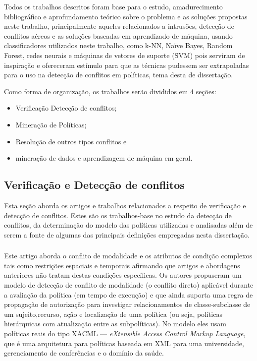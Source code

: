 Todos os trabalhos descritos foram base para o estudo, amadurecimento bibliográfico e aprofundamento teórico sobre o problema e as soluções propostas neste trabalho, principalmente aqueles relacionados a intrusões, detecção de conflitos aéreos e as soluções baseadas em aprendizado de máquina, usando classificadores utilizados neste trabalho, como k-NN, Naïve Bayes, Random Forest, redes neurais e máquinas de vetores de suporte (SVM) pois serviram de inspiração e ofereceram estímulo para que as técnicas pudessem ser extrapoladas para o uso na detecção de conflitos em políticas, tema desta de dissertação. 

Como forma de organização, os trabalhos serão divididos em 4 seções:\begin{itemize}
	\item Verificação Detecção de conflitos;
	\item Mineração de Políticas;
	\item Resolução de outros tipos conflitos e 
	\item mineração de dados e aprendizagem de máquina em geral.
\end{itemize}

\subsection{Verificação e Detecção de conflitos}\label{sec:deteccao-conflitos}
Esta seção aborda os artigos e trabalhos relacionados a respeito de verificação e detecção de conflitos. Estes são os trabalhos-base no estudo da detecção de conflitos, da determinação do modelo das políticas utilizadas e analisadas além de serem a fonte de algumas das principais definições empregadas nesta dissertação.
\subsubsection{\cite{kuang_modality_2020} }
Este artigo aborda o conflito de modalidade e os atributos de condição complexos tais como restrições espaciais e temporais afirmando que artigos e abordagens anteriores não tratam destas condições específicas. Os autores propuseram um modelo de detecção de conflito de modalidade (o conflito direto) aplicável durante a avaliação da política (em tempo de execução) e que ainda suporta uma regra de propagação de autorização para investigar relacionamentos de classe-subclasse de um sujeito,recurso, ação e localização de uma política (ou seja, políticas hierárquicas com atualização entre as subpolíticas). No modelo eles usam políticas reais do tipo XACML --- \textit{eXtensible Access Control Markup Language}, que é uma arquitetura para políticas baseada em XML  para uma universidade, gerenciamento de conferências e o domínio da saúde. 

